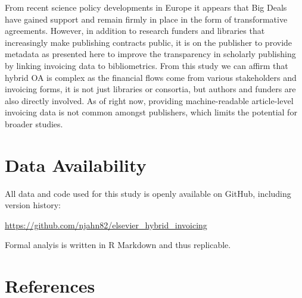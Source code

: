 \documentclass[a4paper,man,floatsintext,longtable,noextraspace,12pt]{apa6}
\begin{document}
From recent science policy developments in Europe it appears that Big
Deals have gained support and remain firmly in place in the form of
transformative agreements. However, in addition to research funders and
libraries that increasingly make publishing contracts public, it is on
the publisher to provide metadata as presented here to improve the
transparency in scholarly publishing by linking invoicing data to
bibliometrics. From this study we can affirm that hybrid OA is complex
as the financial flows come from various stakeholders and invoicing
forms, it is not just libraries or consortia, but authors and funders
are also directly involved. As of right now, providing machine-readable
article-level invoicing data is not common amongst publishers, which
limits the potential for broader studies.

\hypertarget{data-availability}{%
\section{Data Availability}\label{data-availability}}

All data and code used for this study is openly available on GitHub,
including version history:

\url{https://github.com/njahn82/elsevier_hybrid_invoicing}

Formal analyis is written in R Markdown and thus replicable.

\hypertarget{references}{%
\section*{References}\label{references}}
\end{document}
